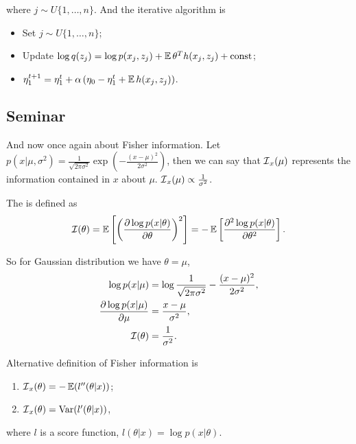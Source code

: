 where $j \sim U\{1, \ldots, n\}$. And the iterative algorithm is 
\begin{itemize}
    \item Set $j \sim U\{1, \ldots, n\}$; 
    \item Update $\log q(z_j) = \log p(x_j, z_j) + \operatorname{\mathbb{E}} \theta^T h(x_j, z_j) + \operatorname{const}$;
    \item $\eta_1^{t+1} = \eta_1^t + \alpha \left( \eta_0 - \eta_1^t + \operatorname{\mathbb{E}} h(x_j, z_j) \right)$.
\end{itemize}

\subsection{Seminar}

And now once again about Fisher information. Let $p(x | \mu, \sigma^2) = \frac{1}{\sqrt{2\pi \sigma^2}} \exp \left( -\frac{(x - \mu)^2}{2\sigma^2} \right)$, then we can say that $\operatorname{\mathcal{I}}_x(\mu)$ represents the information contained in $x$ about $\mu$. $\operatorname{\mathcal{I}}_x(\mu) \propto \frac{1}{\sigma^2}$. 

\begin{edefn}
    The  is defined as $$\operatorname{\mathcal{I}}(\theta) = \operatorname{\mathbb{E}} \left[ \left( \frac{\partial \log p(x | \theta)}{\partial \theta} \right)^2 \right] = -\operatorname{\mathbb{E}} \left[ \frac{\partial^2 \log p(x | \theta)}{\partial \theta^2} \right].$$
\end{edefn}

So for Gaussian distribution we have $\theta = \mu$, 
\begin{equation*}
    \begin{aligned}
        \log p(x | \mu) &= \log \frac{1}{\sqrt{2 \pi \sigma^2}}- \frac{(x - \mu)^2}{2\sigma^2}, \\ 
        \frac{\partial \log p(x | \mu)}{\partial \mu} &= \frac{x - \mu}{\sigma^2}, \\
        \operatorname{\mathcal{I}}(\theta) &= \frac{1}{\sigma^2}.
    \end{aligned}
\end{equation*}

Alternative definition of Fisher information is
\begin{enumerate}
    \item $\operatorname{\mathcal{I}}_x(\theta) = - \operatorname{\mathbb{E}}(l''(\theta | x))$; 
    \item $\operatorname{\mathcal{I}}_x(\theta) = \operatorname{Var} (l'(\theta |x))$,
\end{enumerate}

where $l$ is a score function, $l(\theta | x) = \log p(x | \theta)$. 

